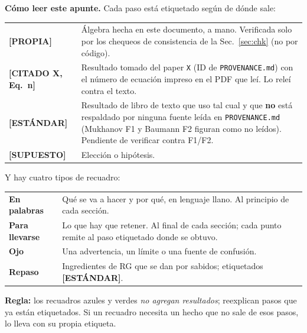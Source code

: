 \documentclass[11pt,a4paper]{article}
\newcommand{\propia}{{\bfseries\color{TealBlue}[PROPIA]}}
\newcommand{\estandar}{{\bfseries\color{BurntOrange}[ESTÁNDAR]}}
\newcommand{\supuesto}{{\bfseries\color{Plum}[SUPUESTO]}}
\newcommand{\citado}[1]{{\bfseries\color{RoyalBlue}[CITADO #1]}}
\newcommand{\sub}[2]{\par\medskip\noindent{\bfseries\color{NavyBlue}#1}\quad\textbf{#2}}
\begin{document}
\sub{0.1}{Cómo leer este apunte.} Cada paso está etiquetado según de dónde sale:

\begin{center}\small
\renewcommand{\arraystretch}{1.2}
\begin{tabular}{@{}l@{\hspace{1.2em}}L{11.6cm}@{}}
\toprule
\propia & Álgebra hecha en este documento, a mano. Verificada solo por los chequeos de consistencia de la Sec.~\ref{sec:chk} (no por código).\\
\citado{X, Eq.~n} & Resultado tomado del paper \texttt{X} (ID de \texttt{PROVENANCE.md}) con el número de ecuación impreso en el PDF que leí. Lo releí contra el texto.\\
\estandar & Resultado de libro de texto que uso tal cual y que \textbf{no} está respaldado por ninguna fuente leída en \texttt{PROVENANCE.md} (Mukhanov F1 y Baumann F2 figuran como no leídos). Pendiente de verificar contra F1/F2.\\
\supuesto & Elección o hipótesis.\\
\bottomrule
\end{tabular}
\end{center}

Y hay cuatro tipos de recuadro:

\begin{center}\small
\renewcommand{\arraystretch}{1.2}
\begin{tabular}{@{}l@{\hspace{1.2em}}L{11.6cm}@{}}
\toprule
{\bfseries\color{NavyBlue}En palabras} & Qué se va a hacer y por qué, en lenguaje llano. Al principio de cada sección.\\
{\bfseries\color{OliveGreen}Para llevarse} & Lo que hay que retener. Al final de cada sección; cada punto remite al paso etiquetado donde se obtuvo.\\
{\bfseries\color{BurntOrange}Ojo} & Una advertencia, un límite o una fuente de confusión.\\
{\bfseries\color{black}Repaso} & Ingredientes de RG que se dan por sabidos; etiquetados \estandar.\\
\bottomrule
\end{tabular}
\end{center}

\textbf{Regla:} los recuadros azules y verdes \emph{no agregan resultados}; reexplican pasos que ya están etiquetados. Si un recuadro necesita un hecho que no sale de esos pasos, lo lleva con su propia etiqueta.
\end{document}
